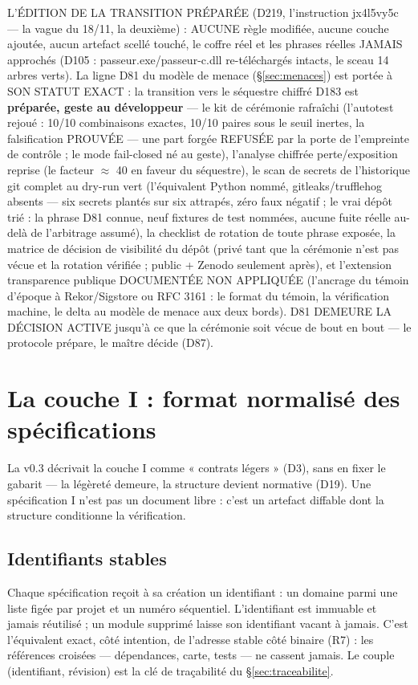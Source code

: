 L'ÉDITION DE LA TRANSITION PRÉPARÉE (D219, l'instruction jx4l5vy5c — la
vague du 18/11, la deuxième) : AUCUNE règle modifiée, aucune couche
ajoutée, aucun artefact scellé touché, le coffre réel et les phrases
réelles JAMAIS approchés (D105 : passeur.exe/passeur-c.dll re-téléchargés
intacts, le sceau 14 arbres verts). La ligne D81 du modèle de menace
(§\ref{sec:menaces}) est portée à SON STATUT EXACT : la transition vers
le séquestre chiffré D183 est \textbf{préparée, geste au développeur} —
le kit de cérémonie rafraîchi (l'autotest rejoué : 10/10 combinaisons
exactes, 10/10 paires sous le seuil inertes, la falsification PROUVÉE —
une part forgée REFUSÉE par la porte de l'empreinte de contrôle ; le
mode  fail-closed né au geste), l'analyse chiffrée
perte/exposition reprise (le facteur $\approx$ 40 en faveur du
séquestre), le scan de secrets de l'historique git complet au dry-run
vert (l'équivalent Python nommé, gitleaks/trufflehog absents — six
secrets plantés sur six attrapés, zéro faux négatif ; le vrai dépôt
trié : la phrase D81 connue, neuf fixtures de test nommées, aucune
fuite réelle au-delà de l'arbitrage assumé), la checklist de rotation de
toute phrase exposée, la matrice de décision de visibilité du dépôt
(privé tant que la cérémonie n'est pas vécue et la rotation vérifiée ;
public + Zenodo seulement après), et l'extension transparence publique
DOCUMENTÉE NON APPLIQUÉE (l'ancrage du témoin d'époque à Rekor/Sigstore
ou RFC 3161 : le format du témoin, la vérification machine, le delta au
modèle de menace aux deux bords). D81 DEMEURE LA DÉCISION ACTIVE
jusqu'à ce que la cérémonie soit vécue de bout en bout — le protocole
prépare, le maître décide (D87).

\section{La couche I : format normalisé des spécifications}\label{sec:coucheI}

La v0.3 décrivait la couche I comme « contrats légers » (D3), sans en fixer le gabarit —
la légèreté demeure, la structure devient normative (D19). Une spécification I n’est pas un
document libre : c’est un artefact diffable dont la structure conditionne la vérification.

\subsection{Identifiants stables}

Chaque spécification reçoit à sa création un identifiant  : un domaine
parmi une liste figée par projet et un numéro séquentiel. L’identifiant est immuable et
jamais réutilisé ; un module supprimé laisse son identifiant vacant à jamais. C’est
l’équivalent exact, côté intention, de l’adresse stable côté binaire (R7) : les références
croisées — dépendances, carte, tests — ne cassent jamais. Le couple (identifiant,
révision) est la clé de traçabilité du §\ref{sec:traceabilite}.

